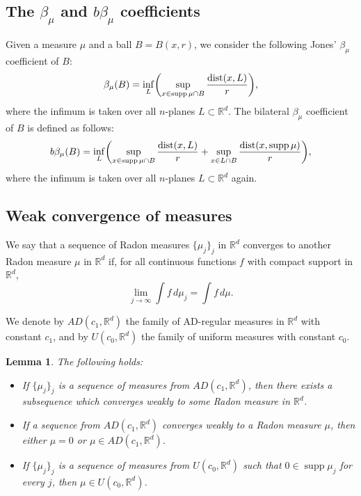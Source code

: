 \documentclass[11pt]{amsart}
\newcommand{\R}{{\mathbb R}}       %
\newcommand{\dist}{{\rm dist}}
\newcommand{\supp}{\operatorname{supp}}
\newtheorem{lemma}[theorem]{Lemma}
\theoremstyle{definition}
\theoremstyle{remark}
\numberwithin{equation}{section}
\begin{document}
\subsection{The $\beta_\mu$ and $b\beta_\mu$ 
coefficients }

Given a measure $\mu$ and a ball $B=B(x,r)$, we consider the following Jones' $ \beta_\mu$ coefficient of $B$:
$$
 \beta_\mu(B) =  
 \inf_L \biggl(\sup_{x\in \supp\mu\cap B}\frac{\dist(x,L)}{r}\biggr),$$
where the infimum is taken over all $n$-planes $L\subset\R^d$.
The bilateral $\beta_\mu$ coefficient of $B$ is defined as follows:
$$
 b\beta_\mu(B) = \inf_L \biggl(\sup_{x\in \supp\mu\cap B}\frac{\dist(x,L)}{r}
 + \sup_{x\in L\cap B}\frac{\dist(x,\supp\mu)}{r}
 \biggr),
$$
where the infimum is taken over all $n$-planes $L\subset\R^d$ again.



\subsection{Weak convergence of measures}

We say that a sequence of Radon measures $\{\mu_j\}_j$ in $\R^d$ converges to another Radon measure
$\mu$ in $\R^d$ if, for all continuous functions $f$ with compact support in $\R^d$,
$$\lim_{j\to\infty}\int f\,d\mu_j = \int f\,d\mu.$$

We denote by $AD(c_1,\R^d)$ the family of AD-regular measures in $\R^d$ with constant $c_1$, and by $U(c_0,\R^d)$
the family of uniform measures with constant $c_0$.


\begin{lemma}\label{lemconvtriv}
The following holds:
\begin{itemize}
\item[(a)] If $\{\mu_j\}_j$ is  a sequence of measures from $AD(c_1,\R^d)$, then there exists a subsequence
which converges weakly to some Radon measure in $\R^d$.
 
\item[(b)] If a sequence from $AD(c_1,\R^d)$ converges weakly to a Radon measure $\mu$, then either
$\mu=0$ or $\mu\in AD(c_1,\R^d)$.

\item[(c)] If $\{\mu_j\}_j$ is  a sequence of measures from $U(c_0,\R^d)$ such that $0\in\supp\mu_j$
for every $j$, then $\mu\in U(c_0,\R^d)$.

\end{itemize}
\end{lemma}
\end{document}
